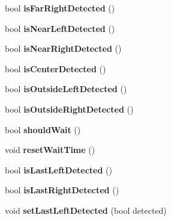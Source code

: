 \begin{DoxyCompactItemize}
\item 
\hypertarget{class_noeud_robot_a538f029bf53a3e1645311164c2c21cb3}{bool {\bfseries is\-Far\-Right\-Detected} ()}\label{class_noeud_robot_a538f029bf53a3e1645311164c2c21cb3}

\item 
\hypertarget{class_noeud_robot_a80b2c83b5bcca76ab8c5d50967dd9637}{bool {\bfseries is\-Near\-Left\-Detected} ()}\label{class_noeud_robot_a80b2c83b5bcca76ab8c5d50967dd9637}

\item 
\hypertarget{class_noeud_robot_a8d18374cb7ccc6abf7d81e84b5e2895a}{bool {\bfseries is\-Near\-Right\-Detected} ()}\label{class_noeud_robot_a8d18374cb7ccc6abf7d81e84b5e2895a}

\item 
\hypertarget{class_noeud_robot_a009107b9beb4b85c4e45093662259997}{bool {\bfseries is\-Center\-Detected} ()}\label{class_noeud_robot_a009107b9beb4b85c4e45093662259997}

\item 
\hypertarget{class_noeud_robot_a0b353d1b8a72a8bc0c74af495856175c}{bool {\bfseries is\-Outside\-Left\-Detected} ()}\label{class_noeud_robot_a0b353d1b8a72a8bc0c74af495856175c}

\item 
\hypertarget{class_noeud_robot_ada097c4f0d1cff06c4205e057a4ff7b3}{bool {\bfseries is\-Outside\-Right\-Detected} ()}\label{class_noeud_robot_ada097c4f0d1cff06c4205e057a4ff7b3}

\item 
\hypertarget{class_noeud_robot_aeedac936662d73d50a2f436a39387a5c}{bool {\bfseries should\-Wait} ()}\label{class_noeud_robot_aeedac936662d73d50a2f436a39387a5c}

\item 
\hypertarget{class_noeud_robot_a46c46ad4fb320aaf4adb747584e12ca8}{void {\bfseries reset\-Wait\-Time} ()}\label{class_noeud_robot_a46c46ad4fb320aaf4adb747584e12ca8}

\item 
\hypertarget{class_noeud_robot_af19faf1dcf809f0fb5419089f6d5c4c1}{bool {\bfseries is\-Last\-Left\-Detected} ()}\label{class_noeud_robot_af19faf1dcf809f0fb5419089f6d5c4c1}

\item 
\hypertarget{class_noeud_robot_a11213fc3369ed504b62234882935716d}{bool {\bfseries is\-Last\-Right\-Detected} ()}\label{class_noeud_robot_a11213fc3369ed504b62234882935716d}

\item 
\hypertarget{class_noeud_robot_ab8c2a79fe2277ded055e3303ed1493f2}{void {\bfseries set\-Last\-Left\-Detected} (bool detected)}\label{class_noeud_robot_ab8c2a79fe2277ded055e3303ed1493f2}


\end{DoxyCompactItemize}
